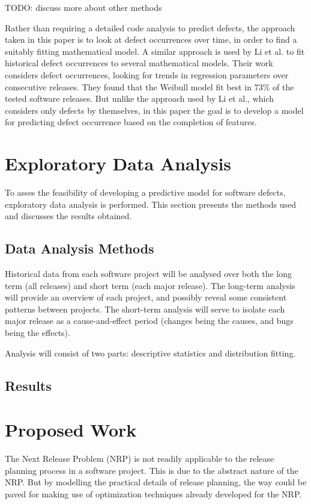 \documentclass[a4paper]{scrartcl}
\begin{document}
TODO: discuss more about other methods

Rather than requiring a detailed code analysis to predict defects, the approach taken in this paper is to look at defect occurrences over time, in order to find a suitably fitting mathematical model. A similar approach is used by Li et al. \cite{2004_li_emperical_eval} to fit historical defect occurrences to several mathematical models. Their work considers defect occurrences, looking for trends in regression parameters over consecutive releases. They found that the Weibull model fit best in 73\% of the tested software releases. But unlike the approach used by Li et al., which considers only defects by themselves, in this paper the goal is to develop a model for predicting defect occurrence based on the completion of features.

\section{Exploratory Data Analysis}
\label{sec:exploratory}
To asses the feasibility of developing a predictive model for software defects, exploratory data analysis is performed. This section presents the methods used and discusses the results obtained.

\subsection{Data Analysis Methods}
Historical data from each software project will be analysed over both the long term (all releases) and short term (each major release). The long-term analysis will provide an overview of each project, and possibly reveal some consistent patterns between projects. The short-term analysis will serve to isolate each major release as a cause-and-effect period (changes being the causes, and bugs being the effects).

Analysis will consist of two parts: descriptive statistics and distribution fitting.

\subsection{Results}

\section{Proposed Work}
\label{sec:proposed_work}

The Next Release Problem (NRP) is not readily applicable to the release planning process in a software project. This is due to the abstract nature of the NRP. But by modelling the practical details of release planning, the way could be paved for making use of optimization techniques already developed for the NRP.
\end{document}
